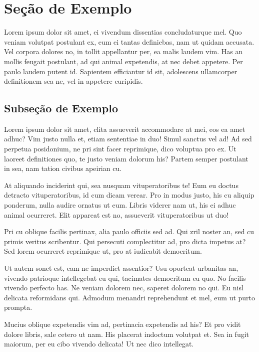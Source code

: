 \documentclass[
	12pt,				%
	openright,			%
	oneside,			%
	a4paper,			%
	english,			%
	french,				%
	spanish,			%
	brazil,				%
	]{abntex2}
\begin{document}
\section{Seção de Exemplo}
\label{sec: exemplo}

Lorem ipsum dolor sit amet, ei vivendum dissentias concludaturque mel. Quo veniam volutpat postulant ex, eum ei tantas definiebas, nam ut quidam accusata. Vel corpora dolores no, in tollit appellantur per, ea malis laudem vim. Has an mollis feugait postulant, ad qui animal expetendis, at nec debet appetere. Per paulo laudem putent id. Sapientem efficiantur id sit, adolescens ullamcorper definitionem sea ne, vel in appetere euripidis.



\subsection{Subseção de Exemplo}

Lorem ipsum dolor sit amet, clita assueverit accommodare at mei, eos ea amet adhuc? Vim justo nulla et, etiam sententiae in duo! Simul sanctus vel ad! Ad sed perpetua posidonium, ne pri sint facer reprimique, dico voluptua pro ex. Ut laoreet definitiones quo, te justo veniam dolorum his? Partem semper postulant in sea, nam tation civibus apeirian cu.



At aliquando inciderint qui, sea nusquam vituperatoribus te! Eum eu doctus detracto vituperatoribus, id cum dicam verear. Pro in modus justo, his cu aliquip ponderum, nulla audire ornatus ut eum. Libris viderer nam ut, his ei adhuc animal ocurreret. Elit appareat est no, assueverit vituperatoribus ut duo!

Pri cu oblique facilis pertinax, alia paulo officiis sed ad. Qui zril noster an, sed cu primis veritus scribentur. Qui persecuti complectitur ad, pro dicta impetus at? Sed lorem ocurreret reprimique ut, pro at iudicabit democritum.

Ut autem sonet est, eam ne imperdiet assentior? Usu oporteat urbanitas an, vivendo patrioque intellegebat eu qui, tacimates democritum eu quo. No facilis vivendo perfecto has. Ne veniam dolorem nec, saperet dolorem no qui. Eu nisl delicata reformidans qui. Admodum menandri reprehendunt et mel, eum ut purto prompta.

Mucius oblique expetendis vim ad, pertinacia expetendis ad his? Et pro vidit dolore libris, sale cetero ut nam. His placerat indoctum volutpat et. Sea in fugit maiorum, per eu cibo vivendo delicata! Ut nec dico intellegat.
\end{document}
